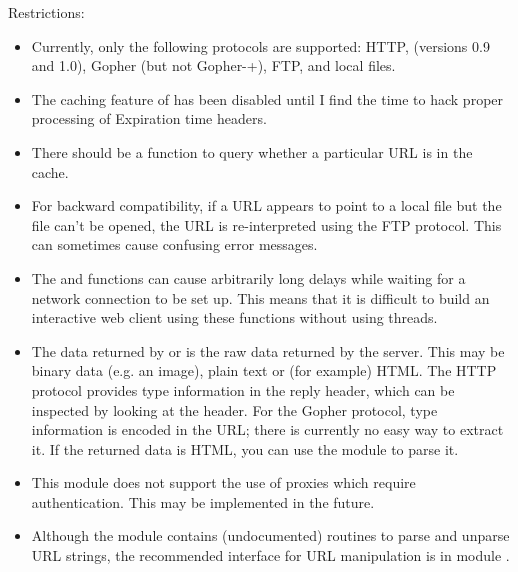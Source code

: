 Restrictions:

\begin{itemize}

\item
Currently, only the following protocols are supported: HTTP, (versions
0.9 and 1.0), Gopher (but not Gopher-+), FTP, and local files.

\item
The caching feature of  has been disabled
until I find the time to hack proper processing of Expiration time
headers.

\item
There should be a function to query whether a particular URL is in
the cache.

\item
For backward compatibility, if a URL appears to point to a local file
but the file can't be opened, the URL is re-interpreted using the FTP
protocol.  This can sometimes cause confusing error messages.

\item
The  and  functions can
cause arbitrarily long delays while waiting for a network connection
to be set up.  This means that it is difficult to build an interactive
web client using these functions without using threads.

\item
The data returned by  or 
is the raw data returned by the server.  This may be binary data
(e.g. an image), plain text or (for example) HTML.  The
HTTP protocol provides type information in the
reply header, which can be inspected by looking at the
 header.  For the Gopher
protocol, type information is encoded in the URL; there is currently
no easy way to extract it.  If the returned data is HTML, you can use
the module  to parse it.

\item
This module does not support the use of proxies which require
authentication.  This may be implemented in the future.

\item
Although the  module contains (undocumented) routines
to parse and unparse URL strings, the recommended interface for URL
manipulation is in module .

\end{itemize}


